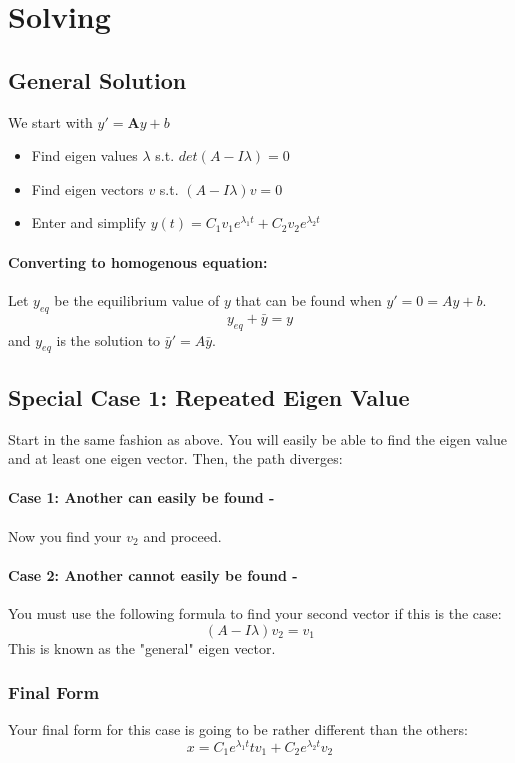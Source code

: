 \documentclass[a4paper,12pt]{report}
\begin{document}
\section{Solving}
\subsection{General Solution}
We start with $y' = \pmb{A}y+b$
\begin{itemize}
\item Find eigen values $\lambda$ s.t. $det(A-I\lambda) = 0$
\item Find eigen vectors $v$ s.t. $(A-I\lambda)v = 0$
\item Enter and simplify $y(t) = C_1 v_1 e^{\lambda_1 t} + C_2 v_2 e^{\lambda_2 t}$
\end{itemize}
\paragraph{Converting to homogenous equation: } Let $y_{eq}$ be the equilibrium value of $y$ that 
can be found when $y' = 0 = Ay + b$. 
$$y_{eq} + \bar{y} = y$$ and $y_{eq}$ is the solution to $\bar{y}' = A\bar{y}$.


\subsection{Special Case 1: Repeated Eigen Value}
Start in the same fashion as above. You will easily be able to find the eigen value and 
at least one eigen vector. Then, the path diverges:

\paragraph{Case 1: Another can easily be found - } Now you find your $v_2$ and proceed.

\paragraph{Case 2: Another cannot easily be found - } You must use the following formula 
to find your second vector if this is the case:
$$(A-I\lambda)v_2 = v_1$$
This is known as the "general" eigen vector.

\subsubsection{Final Form}
Your final form for this case is going to be rather different than the others:
$$x = C_1e^{\lambda_1 t}tv_1 + C_2e^{\lambda_2 t}v_2$$
\end{document}
